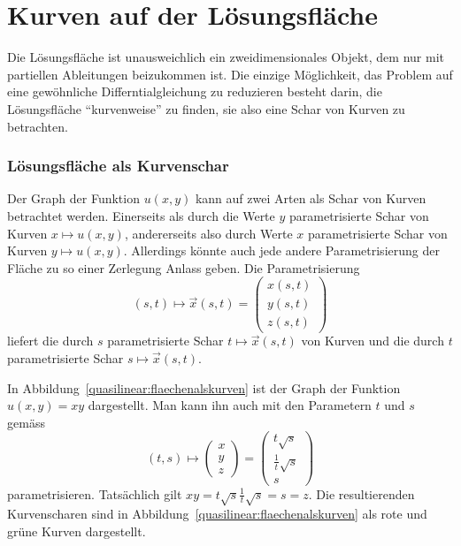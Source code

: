 %
%
%

\section{Kurven auf der Lösungsfläche}
Die Lösungsfläche ist unausweichlich ein zweidimensionales
Objekt, dem nur mit partiellen Ableitungen beizukommen ist.
Die einzige Möglichkeit, das Problem auf eine gewöhnliche
Differntialgleichung zu reduzieren besteht darin, die Lösungsfläche
``kurvenweise'' zu finden, sie also eine Schar von Kurven
zu betrachten.

\subsubsection{Lösungsfläche als Kurvenschar}
Der Graph der Funktion $u(x,y)$ kann auf zwei Arten als Schar von
Kurven betrachtet werden.
Einerseits als durch die Werte $y$
parametrisierte Schar von Kurven $x\mapsto u(x,y)$, andererseits
also durch Werte $x$ parametrisierte Schar von Kurven $y\mapsto u(x,y)$.
Allerdings könnte auch jede andere Parametrisierung der Fläche
zu so einer Zerlegung Anlass geben. Die Parametrisierung
\begin{equation}
(s,t)\mapsto \vec x(s,t)
=
\begin{pmatrix}x(s,t)\\y(s,t)\\z(s,t)\end{pmatrix}
\label{quasilinear:kurvenschar}
\end{equation}
liefert die durch $s$ parametrisierte Schar $t\mapsto \vec x(s,t)$
von Kurven und die durch $t$ parametrisierte Schar $s\mapsto\vec x(s,t)$.

In Abbildung~\ref{quasilinear:flaechenalskurven} ist der Graph der
Funktion $u(x,y)=xy$ dargestellt.
Man kann ihn auch mit den Parametern $t$ und $s$ gemäss
\begin{equation}
(t,s)
\mapsto
\begin{pmatrix}x\\y\\z\end{pmatrix}
=
\begin{pmatrix}t\sqrt{s}\\\frac1t\sqrt{s}\\s\end{pmatrix}
\label{quasliniear:flaechebeispiel}
\end{equation}
parametrisieren.
Tatsächlich gilt $xy = t\sqrt{s}\frac1t\sqrt{s}=s=z$.
Die resultierenden Kurvenscharen sind in
Abbildung~\ref{quasilinear:flaechenalskurven} als rote und grüne Kurven
dargestellt.


